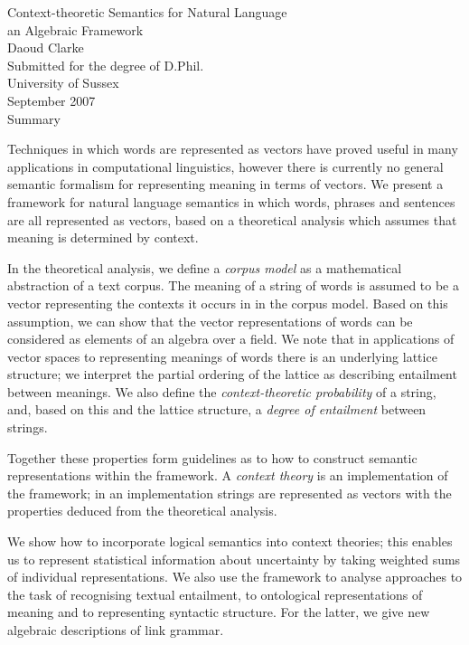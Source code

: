 \documentclass[a4paper,oneside,12pt]{report}
\begin{document}
\begin{titlepage}
\vspace*{2.5cm}\noindent
{\cmtitle Context-theoretic Semantics for Natural Language}\\
{\cmsection an Algebraic Framework}
\vspace{0.5cm}\\
\large{Daoud Clarke}
\vspace{0.5cm}\\
\large{Submitted for the degree of D.Phil.}\\
\large{University of Sussex}\\
\large{September 2007}
\vspace{1cm}\\
{\cmsection Summary}

\singlespacing
\noindent\normalsize{Techniques in which words are represented as vectors have proved useful in many applications in computational linguistics, however there is currently no general semantic formalism for representing meaning in terms of vectors. We present a framework for natural language semantics in which words, phrases and sentences are all represented as vectors, based on a theoretical analysis which assumes that meaning is determined by context.

In the theoretical analysis, we define a \emph{corpus model} as a mathematical abstraction of a text corpus. The meaning of a string of words is assumed to be a vector representing the contexts it occurs in in the corpus model. Based on this assumption, we can show that the vector representations of words can be considered as elements of an algebra over a field. We note that in applications of vector spaces to representing meanings of words there is an underlying lattice structure; we interpret the partial ordering of the lattice as describing entailment between meanings. We also define the \emph{context-theoretic probability} of a string, and, based on this and the lattice structure, a \emph{degree of entailment} between strings. 

Together these properties form guidelines as to how to construct semantic representations within the framework. A \emph{context theory} is an implementation of the framework; in an implementation strings are represented as vectors with the properties deduced from the theoretical analysis.

We show how to incorporate logical semantics into context theories; this enables us to represent statistical information about uncertainty by taking weighted sums of individual representations. We also use the framework to analyse approaches to the task of recognising textual entailment, to ontological representations of meaning and to representing syntactic structure. For the latter, we give new algebraic descriptions of link grammar.}
\end{titlepage}
\end{document}
